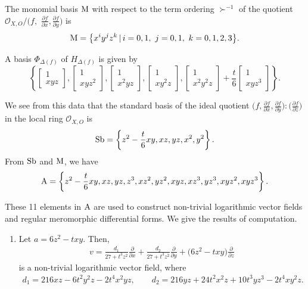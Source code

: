 \documentclass[pdftex]{sigma}%
\numberwithin{equation}{section}
\begin{document}
\begin{Example}
The monomial basis ${\rm M} $ with respect to the term ordering $\succ^{-1}$ of the quotient
${\mathcal O}_{X,O}/\big(f,$ $\frac{\partial f}{\partial x}, \frac{\partial f}{\partial y}\big)$ is
\begin{gather*}
{\rm M} = \big\{ x^i y^j z^k \,|\, i=0,1, \ j=0,1, \ k=0,1,2,3 \big\}.
\end{gather*}

A basis $ \Phi_{\Delta(f)} $ of $ H_{\Delta(f)} $ is given by
\[
\left\{
\begin{bmatrix} 1 \\ x y z \end{bmatrix},
\begin{bmatrix} 1 \\ x y z^{2}\end{bmatrix},
\begin{bmatrix} 1 \\ x^2 y z \end{bmatrix},
\begin{bmatrix} 1 \\ x y^2 z\end{bmatrix},
\begin{bmatrix} 1 \\ x^{2} y^{2} z\end{bmatrix}+ \dfrac{t}{6}
\begin{bmatrix} 1 \\ x y z^{3}\end{bmatrix} \right\}.
\]

We see from this data that the standard basis of the ideal quotient $\big(f, \frac{\partial f}{\partial x}, \frac{\partial f}{\partial y}\big) : \big(\frac{\partial f}{\partial z}\big)$
in the local ring ${\mathcal O}_{X,O}$ is
\begin{gather*}
{\rm Sb} = \left\{z^2-\dfrac{t}{6}xy, xz, yz, x^2, y^2\right\}.
\end{gather*}
From $ {\rm Sb} $ and $ {\rm M} $, we have
\begin{gather*}
{\rm A} =\left\{z^2-\dfrac{t}{6}xy, xz, yz, z^3, xz^2, yz^2, xyz, xz^3, yz^3, xyz^2, xyz^3\right\}.
\end{gather*}

These 11 elements in $ {\rm A} $ are used to construct non-trivial logarithmic vector fields and regular meromorphic differential forms.
We give the results of computation.
\begin{enumerate}\itemsep=0pt
\item[$(i)$] Let $ a=6z^2-txy$. Then,
\begin{gather*}
v=\frac{d_1}{27+t^3z^2}\frac{\partial}{\partial x} +\frac{d_2}{27+t^3z^2}\frac{\partial}{\partial y} +\big(6z^2-txy\big)\frac{\partial}{\partial z}
\end{gather*}
is a non-trivial logarithmic vector field, where
\begin{gather*}
d_1= 216xz-6t^2y^2z-2t^4x^2yz, \qquad
d_2=216yz+24t^2x^2z+10t^3yz^3-2t^4xy^2z.
\end{gather*}


\end{enumerate}
\end{Example}
\end{document}
